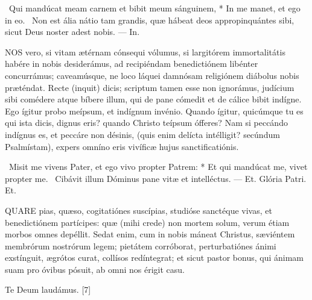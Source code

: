 \R\ Qui mandúcat meam carnem et bibit meum sánguinem, * In me manet, et ego in eo. \V\ Non est ália nátio tam grandis, quæ hábeat deos appropinquántes sibi, sicut Deus noster adest nobis. --- In.


\lettrine[lines=2]{N}{OS} vero, si vitam ætérnam cónsequi vólumus, si largitórem immortalitátis habére in nobis desiderámus, ad recipiéndam benedictiónem libénter concurrámus; caveamúsque, ne loco láquei damnósam religiónem diábolus nobis præténdat. Recte (inquit) dicis; scriptum tamen esse non ignorámus, judícium sibi comédere atque bíbere illum, qui de pane cómedit et de cálice bibit indígne. Ego ígitur probo meípsum, et indígnum invénio. Quando ígitur, quicúmque tu es qui ista dicis, dignus eris? quando Christo teípsum ófferes? Nam si peccándo indígnus es, et peccáre non désinis, (quis enim delícta intélligit? secúndum Psalmístam), expers omníno eris vivíficæ hujus sanctificatiónis.

\R\ Misit me vivens Pater, et ego vivo propter Patrem: * Et qui mandúcat me, vivet propter me. \V\ Cibávit illum Dóminus pane vitæ et intelléctus. --- Et. Glória Patri. Et.


\lettrine[lines=2]{Q}{UARE} pias, quæso, cogitatiónes suscípias, studióse sanctéque vivas, et benedictiónem partícipes: quæ (mihi crede) non mortem solum, verum étiam morbos omnes depéllit. Sedat enim, cum in nobis máneat Christus, sæviéntem membrórum nostrórum legem; pietátem corróborat, perturbatiónes ánimi exstínguit, ægrótos curat, collísos redíntegrat; et sicut pastor bonus, qui ánimam suam pro óvibus pósuit, ab omni nos érigit casu.

Te Deum laudámus. [7]


